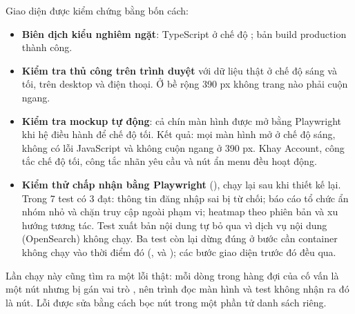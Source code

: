 Giao diện được kiểm chứng bằng bốn cách:
\begin{itemize}
  \item \textbf{Biên dịch kiểu nghiêm ngặt}: TypeScript ở chế độ ; bản build production thành công.
  \item \textbf{Kiểm tra thủ công trên trình duyệt} với dữ liệu thật ở chế độ sáng và tối, trên desktop và điện thoại. Ở bề rộng 390 px không trang nào phải cuộn ngang.
  \item \textbf{Kiểm tra mockup tự động}: cả chín màn hình được mở bằng Playwright khi hệ điều hành để chế độ tối. Kết quả: mọi màn hình mở ở chế độ sáng, không có lỗi JavaScript và không cuộn ngang ở 390 px. Khay Account, công tắc chế độ tối, công tắc nhãn yêu cầu và nút ẩn menu đều hoạt động.
  \item \textbf{Kiểm thử chấp nhận bằng Playwright} (), chạy lại sau khi thiết kế lại. Trong 7 test có 3 đạt: thông tin đăng nhập sai bị từ chối; báo cáo tổ chức ẩn nhóm nhỏ và chặn truy cập ngoài phạm vi; heatmap theo phiên bản và xu hướng tương tác. Test xuất bản nội dung tự bỏ qua vì dịch vụ nội dung (OpenSearch) không chạy. Ba test còn lại dừng đúng ở bước cần container không chạy vào thời điểm đó (,  và ); các bước giao diện trước đó đều qua.
\end{itemize}
Lần chạy này cũng tìm ra một lỗi thật: mỗi dòng trong hàng đợi của cố vấn là một nút nhưng bị gán vai trò , nên trình đọc màn hình và test không nhận ra đó là nút. Lỗi được sửa bằng cách bọc nút trong một phần tử danh sách riêng.
